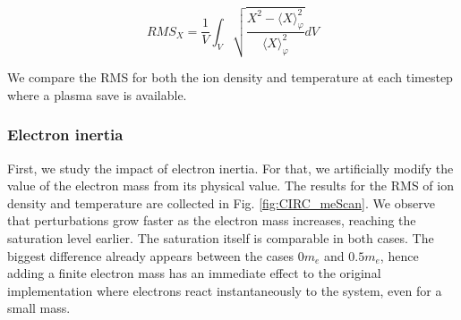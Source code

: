 \begin{equation}
	RMS_X = \frac{1}{V}\int_V \sqrt{\frac{X^2 - \langle X \rangle_\varphi^2}{\langle X \rangle_\varphi^2}}  dV
\end{equation}
	
We compare the RMS for both the ion density and temperature at each timestep where a plasma save is available. 

\subsubsection{Electron inertia}

First, we study the impact of electron inertia. For that, we artificially modify the value of the electron mass from its physical value. The results for the RMS of ion density and temperature are collected in Fig. \ref{fig:CIRC_meScan}. We observe that perturbations grow faster as the electron mass increases, reaching the saturation level earlier. The saturation itself is comparable in both cases. The biggest difference already appears between the cases $0m_e$ and $0.5m_e$, hence adding a finite electron mass has an immediate effect to the original implementation where electrons react instantaneously to the system, even for a small mass. 
 
